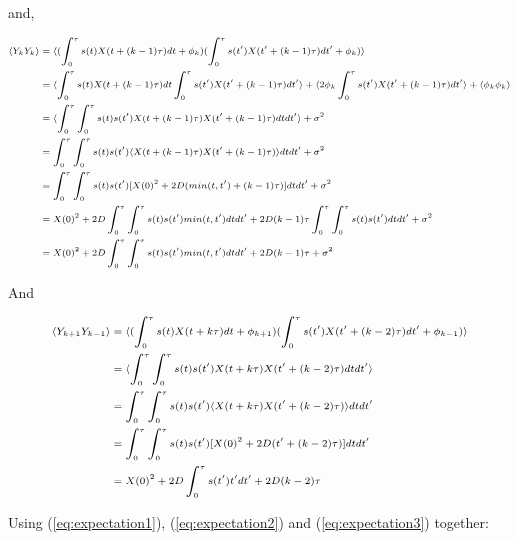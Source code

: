 \documentclass[ba]{imsart}\usepackage[]{graphicx}\usepackage[]{xcolor}
\numberwithin{equation}{section}
\theoremstyle{plain}
\begin{document}
\begin{supplement}
and,

\begin{equation} \label{eq:expectation2}
\scriptsize
\begin{aligned}
\langle Y_{k}Y_{k} \rangle &= \langle (\int_{0}^{\tau} s(t)X(t+(k-1)\tau)dt + \phi_{k}) (\int_{0}^{\tau} s(t')X(t'+(k-1)\tau)dt' + \phi_k) \rangle \\
 &= \langle \int_{0}^{\tau} s(t)X(t+(k-1)\tau)dt \int_{0}^{\tau} s(t')X(t'+(k-1)\tau)dt' \rangle +  \langle 2 \phi_{k} \int_{0}^{\tau} s(t')X(t'+(k-1)\tau)dt' \rangle + \langle  \phi_{k}\phi_{k} \rangle \\
 &= \langle \int_{0}^{\tau} \int_{0}^{\tau} s(t) s(t') X(t+(k-1)\tau) X(t'+(k-1)\tau) dt dt' \rangle + \sigma^2\\
 &= \int_{0}^{\tau} \int_{0}^{\tau} s(t) s(t') \langle X(t+(k-1)\tau) X(t'+(k-1)\tau) \rangle dt dt'  + \sigma^2 \\
 &= \int_{0}^{\tau} \int_{0}^{\tau} s(t) s(t')[ X(0)^2+2D (min(t,t')+(k-1)\tau )] dt dt' + \sigma^2 \\
 &=  X(0)^2 +2D \int_{0}^{\tau} \int_{0}^{\tau} s(t) s(t') min(t,t') dt dt'+ 2D (k-1)\tau \int_{0}^{\tau} \int_{0}^{\tau} s(t) s(t') dt dt'  + \sigma^2 \\
 &=  X(0)^2  + 2D \int_{0}^{\tau} \int_{0}^{\tau} s(t) s(t') min(t,t') dt dt'+ 2D (k-1)\tau  + \sigma^2
\end{aligned}
\end{equation}

And

\begin{equation} \label{eq:expectation3}
\scriptsize
\begin{aligned}
\langle Y_{k+1}Y_{k-1} \rangle &= \langle (\int_{0}^{\tau} s(t)X(t+k\tau)dt + \phi_{k+1}) (\int_{0}^{\tau} s(t')X(t'+(k-2)\tau)dt' + \phi_{k-1}) \rangle \\
 &= \langle \int_{0}^{\tau} \int_{0}^{\tau} s(t) s(t') X(t+k\tau) X(t'+(k-2)\tau) dt dt' \rangle \\
 &= \int_{0}^{\tau} \int_{0}^{\tau} s(t) s(t') \langle X(t+k\tau) X(t'+(k-2)\tau) \rangle dt dt'  \\
 &= \int_{0}^{\tau} \int_{0}^{\tau} s(t) s(t')[ X(0)^2+2D (t'+(k-2)\tau )] dt dt' \\
 &=  X(0)^2 +2D \int_{0}^{\tau} s(t') t' dt'+ 2D (k-2)\tau
\end{aligned}
\end{equation}

Using (\ref{eq:expectation1}), (\ref{eq:expectation2}) and (\ref{eq:expectation3}) together:


\end{supplement}
\end{document}
